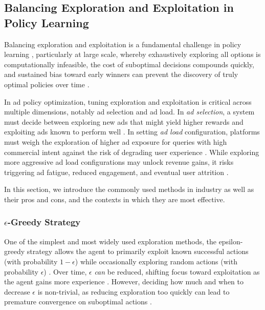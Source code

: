 \documentclass[final]{anthology-ch}         %
\begin{document}
\subsection{Balancing Exploration and Exploitation in Policy Learning}

Balancing exploration and exploitation is a fundamental challenge in policy learning \cite{Sutton1998}, particularly at large scale, whereby exhaustively exploring all options is computationally infeasible, the cost of suboptimal decisions compounds quickly, and sustained bias toward early winners can prevent  the discovery of truly optimal policies over time \cite{dulac2021challenges}.

In ad policy optimization, tuning exploration and exploitation is critical across multiple dimensions, notably ad selection and ad load. In \textit{ad selection}, a system must decide between exploring new ads that might yield higher rewards and exploiting ads known to perform well \cite{russo2018tutorial,auer2002finite, bietti2021contextual}. In setting \textit{ad load} configuration, platforms must weigh the exploration of higher ad exposure for queries with high commercial intent against the risk of degrading user experience \cite{zhang2018whole, carrion2021blending, hohnhold2015focusing}. While exploring more aggressive ad load configurations may unlock revenue gains, it risks triggering ad fatigue, reduced engagement, and eventual user attrition \cite{silberstein2023combating, sagtani2023quantifying}. 

In this section, we introduce the commonly used methods in industry as well as their pros and cons,  and the contexts in which they are most effective.

\subsubsection{\textbf{\texorpdfstring{$\epsilon$}{epsilon}-Greedy Strategy}}

One of the simplest and most widely used exploration methods, the epsilon-greedy strategy allows the agent to primarily exploit known successful actions (with probability $1 - \epsilon$) while occasionally exploring random actions (with probability $\epsilon$) \cite{Sutton1998, russell2016artificial}. Over time, $\epsilon$ \textit{can} be reduced, shifting focus toward exploitation as the agent gains more experience \cite{russo2018tutorial, Sutton1998}. However, deciding how much and when to decrease $\epsilon$ is non-trivial, as reducing exploration too quickly can lead to premature convergence on suboptimal actions \cite{Sutton1998, dulac2019challenges}. 
    
\end{document}
